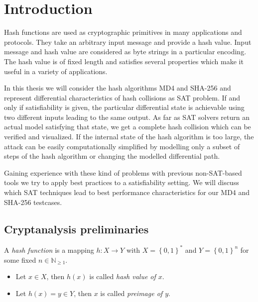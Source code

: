 \renewcommand*\chappic{img/intro.pdf}
\renewcommand*\chapquote{}
\renewcommand*\chapquotesrc{}
\chapter{Introduction}
\label{ch:intro}
%
Hash functions are used as cryptographic primitives in many applications and protocols.
They take an arbitrary input message and provide a hash value. Input message and hash value
are considered as byte strings in a particular encoding.
The hash value is of fixed length and satisfies several properties which make it useful
in a variety of applications.

In this thesis we will consider the hash algorithms MD4 and SHA-256 and represent
differential characteristics of hash collisions as SAT problem. If and only if
satisfiability is given, the particular differential state is achievable
using two different inputs leading to the same output. As far as SAT solvers
return an actual model satisfying that state, we get a complete hash collision
which can be verified and visualized.
If the internal state of the hash algorithm is too large, the attack can be easily
computationally simplified by modelling only a subset of steps of the hash algorithm
or changing the modelled differential path.

Gaining experience with these kind of problems with previous non-SAT-based tools
we try to apply best practices to a satisfiability setting.
We will discuss which SAT techniques lead to best performance characteristics
for our MD4 and SHA-256 testcases.

\newpage  %
\section{Cryptanalysis preliminaries}
\label{sec:intro-crypt-prelim}
%
\begin{defi}
  A \emph{hash function} is a mapping $h: X \to Y$ with $X = \left\{0,1\right\}^*$ and
  $Y = \left\{0,1\right\}^n$ for some fixed $n \in {\mathbb{N}}_{\geq 1}$.
  \begin{itemize}[noitemsep,topsep=0pt]
    \item Let $x \in X$, then $h(x)$ is called \emph{hash value of $x$}.
    \item Let $h(x) = y \in Y$, then $x$ is called \emph{preimage of $y$}.
  \end{itemize}
\end{defi}

